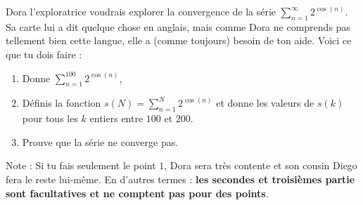\begin{exercice}\label{exotestMAT1151-G320002}

	Dora l'exploratrice voudrais explorer la convergence de la série $\sum_{n=1}^{\infty}2^{\cos(n)}$. Sa carte lui a dit quelque chose en anglais, mais comme Dora ne comprends pas tellement bien cette langue, elle a (comme toujours) besoin de ton aide. Voici ce que tu dois faire :
	\begin{enumerate}
		\item
			Donne $\sum_{n=1}^{100}2^{\cos(n)}$,
		\item
			Définis la fonction $s(N)=\sum_{n=1}^{N}2^{\cos(n)}$ et donne les valeurs de $s(k)$ pour tous les $k$ entiers entre $100$ et $200$.
		\item
			Prouve que la série ne converge pas.
	\end{enumerate}

	Note : Si tu fais seulement le point $1$, Dora sera très contente et son cousin Diego fera le reste lui-même. En d'autres termes : {\bf les secondes et troisièmes partie sont facultatives et ne comptent pas pour des points}.

\end{exercice}
